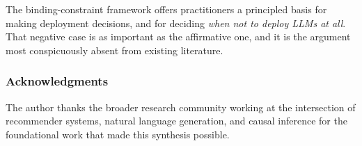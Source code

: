 \documentclass[11pt]{article}
\begin{document}
The binding-constraint framework offers practitioners a principled basis for making deployment decisions, and for deciding \textit{when not to deploy LLMs at all}. That negative case is as important as the affirmative one, and it is the argument most conspicuously absent from existing literature.

\subsubsection*{Acknowledgments}
The author thanks the broader research community working at the intersection of recommender systems, natural language generation, and causal inference for the foundational work that made this synthesis possible.



\end{document}
